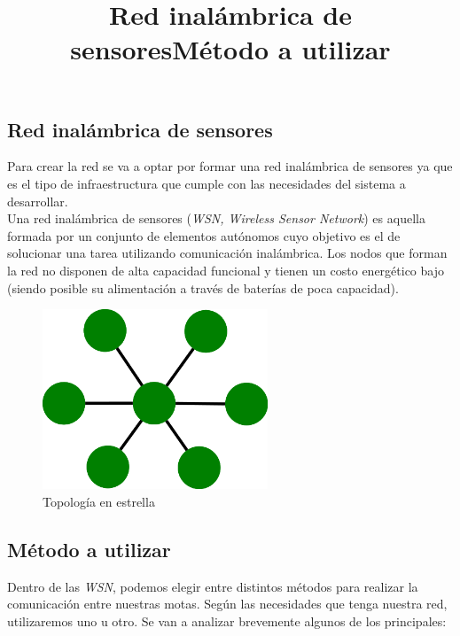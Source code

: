 \subsection{Red inalámbrica de sensores}
\title{Red inalámbrica de sensores}

Para crear la red se va a optar por formar una red inalámbrica de sensores ya que es
el tipo de infraestructura que cumple con las necesidades del sistema a desarrollar.\\

Una red inalámbrica de sensores (\textit{WSN, Wireless Sensor Network}) es aquella formada por un
conjunto de elementos autónomos cuyo objetivo es el de solucionar una tarea utilizando
comunicación inalámbrica. Los nodos que forman la red no disponen de alta capacidad funcional
y tienen un costo energético bajo (siendo posible su alimentación a través de baterías de poca capacidad).\\

\begin{figure}[htb]
\centering
\includegraphics[width=0.6\textwidth]{./imagenes/estrella}
\caption{Topología en estrella} \label{fig:estrella}
\end{figure}

\subsection{Método a utilizar}
\title{Método a utilizar}
Dentro de las \textit{WSN}, podemos elegir entre distintos métodos para realizar la
comunicación entre nuestras motas. Según las necesidades que tenga nuestra red,
utilizaremos uno u otro. Se van a analizar brevemente algunos de los principales:

